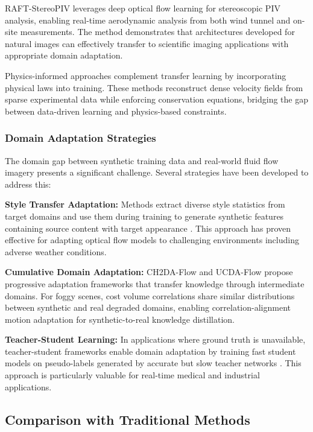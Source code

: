 RAFT-StereoPIV \cite{wang2024raftstereoPIV} leverages deep optical flow learning for stereoscopic PIV analysis, enabling real-time aerodynamic analysis from both wind tunnel and on-site measurements. The method demonstrates that architectures developed for natural images can effectively transfer to scientific imaging applications with appropriate domain adaptation.

Physics-informed approaches complement transfer learning by incorporating physical laws into training. These methods reconstruct dense velocity fields from sparse experimental data while enforcing conservation equations, bridging the gap between data-driven learning and physics-based constraints.

\subsubsection{Domain Adaptation Strategies}

The domain gap between synthetic training data and real-world fluid flow imagery presents a significant challenge. Several strategies have been developed to address this:

\textbf{Style Transfer Adaptation:} Methods extract diverse style statistics from target domains and use them during training to generate synthetic features containing source content with target appearance \cite{chen2024styleadapt}. This approach has proven effective for adapting optical flow models to challenging environments including adverse weather conditions.

\textbf{Cumulative Domain Adaptation:} CH2DA-Flow \cite{zheng2024ch2da} and UCDA-Flow \cite{yan2023ucda} propose progressive adaptation frameworks that transfer knowledge through intermediate domains. For foggy scenes, cost volume correlations share similar distributions between synthetic and real degraded domains, enabling correlation-alignment motion adaptation for synthetic-to-real knowledge distillation.

\textbf{Teacher-Student Learning:} In applications where ground truth is unavailable, teacher-student frameworks enable domain adaptation by training fast student models on pseudo-labels generated by accurate but slow teacher networks \cite{shao2020teacherstudent}. This approach is particularly valuable for real-time medical and industrial applications.

\subsection{Comparison with Traditional Methods}

